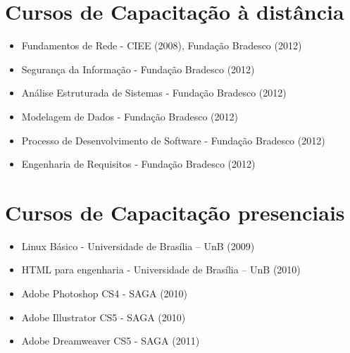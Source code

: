 \section{Cursos de Capacitação à distância}
\begin{itemize}
    \item Fundamentos de Rede - CIEE (2008), Fundação Bradesco (2012)
    \item Segurança da Informação - Fundação Bradesco (2012)
    \item Análise Estruturada de Sistemas - Fundação Bradesco (2012)
    \item Modelagem de Dados - Fundação Bradesco (2012)
    \item Processo de Desenvolvimento de Software - Fundação Bradesco (2012)
    \item Engenharia de Requisitos - Fundação Bradesco (2012)
\end{itemize}

\section{Cursos de Capacitação presenciais}
\begin{itemize}
    \item Linux Básico - Universidade de Brasília – UnB (2009)
    \item HTML para engenharia - Universidade de Brasília – UnB (2010)
    \item Adobe Photoshop CS4 - SAGA (2010)
    \item Adobe Illustrator CS5 - SAGA (2010)
    \item Adobe Dreamweaver CS5 - SAGA (2011)
\end{itemize}